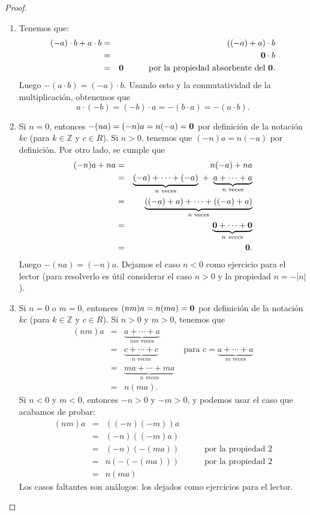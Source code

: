     \begin{proof} \hfill
        \begin{enumerate}
        \item Tenemos que:
            \begin{eqnarray*} (-a)\cdot b + a \cdot b & = & ((-a) +
            a) \cdot b\\ & = & \mathbf{0} \cdot b\\ 
            & = & \mathbf{0} \quad\quad\quad \text{por la propiedad absorbente del $\mathbf{0}$}.
            \end{eqnarray*}
    Luego $-(a \cdot b) = (-a)\cdot b$. Usando esto y la 
            conmutatividad de la multiplicación, obtenemos que $$a\cdot (-b) = (-b) \cdot a = -(b\cdot a) = -(a\cdot b).$$
    
            \item Si $n = 0$, entonces $-(na) = (-n)a = n(-a) = \mathbf{0}$ por definición de la notación $kc$ (para $k \in \mathbb{Z}$ y $c \in
            R$). Si $n > 0$, tenemos que $(-n)a = n(-a)$ por definición. Por otro lado, se cumple que
    \begin{eqnarray*}
    (-n)a + na & = & n(-a) + na\\
    & = & \underbrace{(-a) +\cdots + (-a)}_\text{$n$ veces} \ + \ \underbrace{a +\cdots + a}_\text{$n$ veces}\\ 
    & = & \underbrace{((-a) + a) + \cdots + ((-a) + a)}_\text{$n$ veces}\\
    & = & \underbrace{\mathbf{0} + \cdots + \mathbf{0}}_\text{$n$ veces}\\
    & = & \mathbf{0}.
    \end{eqnarray*}
    Luego $-(na) = (-n)a$. Dejamos el caso $n < 0$ como ejercicio para el lector (para resolverlo es útil considerar el caso $n > 0$ y la propiedad $n = -|n|$). 
    
    \item Si $n = 0$ o $m = 0$, entonces $(nm)a = n(ma) = \mathbf{0}$ por definición de la notación $kc$ (para $k \in \mathbb{Z}$ y $c \in
            R$). Si $n > 0$ y $m > 0$, tenemos que
    \begin{eqnarray*}
    (nm)a &=& \underbrace{a +\cdots + a}_\text{$nm$ veces}\\
     &=& \underbrace{c +\cdots + c}_\text{$n$ veces} \quad\quad\quad \text{para }
     c = \underbrace{a +\cdots + a}_\text{$m$ veces}\\
     & = & \underbrace{ma +\cdots + ma}_\text{$n$ veces}\\
     & = & n(ma).
    \end{eqnarray*}
    Si $n < 0$ y $m < 0$, entonces $-n > 0$ y $-m > 0$, y podemos usar el caso que acabamos de probar:
    \begin{eqnarray*}
    (nm)a &=& ((-n)(-m))a\\
     &=& (-n)((-m)a)\\
     &=& (-n)(-(ma)) \quad\quad\quad \text{por la propiedad 2}\\
     &=& n(-(-(ma))) \quad\quad\quad \text{por la propiedad 2}\\
     &=& n(ma)
    \end{eqnarray*}
    Los casos faltantes son análogos: los dejados como ejercicios para el lector.
    

\end{enumerate}
\end{proof}
